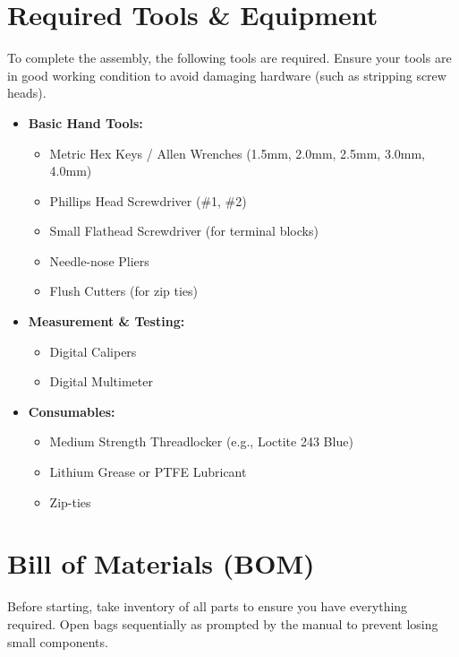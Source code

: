 \documentclass[11pt, a4paper]{article}
\begin{document}
\section{Required Tools \& Equipment}
To complete the assembly, the following tools are required. Ensure your tools are in good working condition to avoid damaging hardware (such as stripping screw heads).

\begin{itemize}[label={\color{primary}\textbullet}]
    \item \textbf{Basic Hand Tools:}
    \begin{itemize}
        \item Metric Hex Keys / Allen Wrenches (1.5mm, 2.0mm, 2.5mm, 3.0mm, 4.0mm)
        \item Phillips Head Screwdriver (\#1, \#2)
        \item Small Flathead Screwdriver (for terminal blocks)
        \item Needle-nose Pliers
        \item Flush Cutters (for zip ties)
    \end{itemize}
    \item \textbf{Measurement \& Testing:}
    \begin{itemize}
        \item Digital Calipers
        \item Digital Multimeter
    \end{itemize}
    \item \textbf{Consumables:}
    \begin{itemize}
        \item Medium Strength Threadlocker (e.g., Loctite 243 Blue)
        \item Lithium Grease or PTFE Lubricant
        \item Zip-ties
    \end{itemize}
\end{itemize}

\newpage
\section{Bill of Materials (BOM)}
Before starting, take inventory of all parts to ensure you have everything required. Open bags sequentially as prompted by the manual to prevent losing small components.
\end{document}
